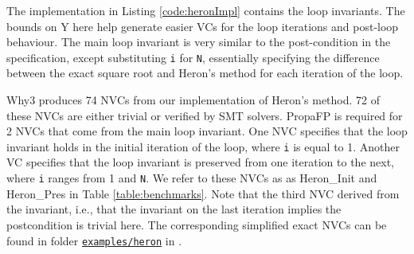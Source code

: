 \documentclass[runningheads]{llncs}
\begin{document}

The implementation in Listing \ref{code:heronImpl} contains the loop invariants.
The bounds on Y here help generate easier VCs for the loop iterations and post-loop behaviour.
The main loop invariant is very similar to the post-condition in the specification, except substituting \lstinline{i} for \lstinline{N}, essentially specifying the difference between the exact square root and Heron's method for each iteration of the loop.

Why3 produces 74 NVCs from our implementation of Heron's method.
72 of these NVCs are either trivial or verified by SMT solvers. %
PropaFP is required for 2 NVCs that come from the main loop invariant. %
One NVC specifies that the loop invariant holds in the initial iteration of the loop, where \lstinline{i} is equal to 1.
Another VC specifies that the loop invariant is preserved from one iteration to the next, where \lstinline{i} ranges from 1 and \lstinline{N}.
We refer to these NVCs as  as Heron\_Init and Heron\_Pres in Table \ref{table:benchmarks}.
Note that the third NVC derived from the invariant, i.e., that the invariant on the last iteration implies the postcondition is trivial here.
The corresponding simplified exact NVCs can be found in folder \href{https://github.com/rasheedja/PropaFP/tree/master/examples/heron/txt}{\texttt{examples/heron}} in \cite{noauthor_rasheedjapropafp_nodate}.
\end{document}
